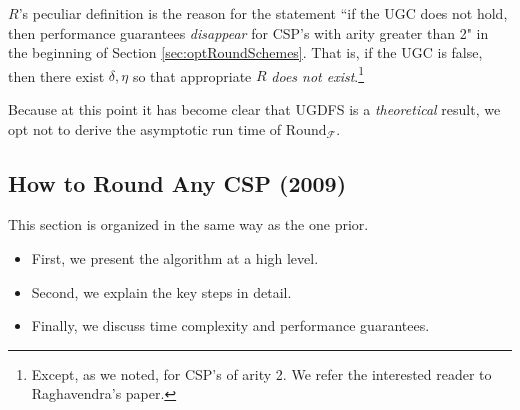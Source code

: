 $R$'s peculiar definition is the reason for the statement ``if the UGC does not hold, then performance guarantees \textit{disappear} for CSP's with arity greater than 2" in the beginning of Section \ref{sec:optRoundSchemes}. That is, if the UGC is false, then there exist $\delta,\eta$ so that appropriate $R$ \textit{does not exist}.\footnote{Except, as we noted, for CSP's of arity 2. We refer the interested reader to Raghavendra's paper.} 

Because at this point it has become clear that UGDFS is a \textit{theoretical} result, we opt not to derive the asymptotic run time of $\text{Round}_{\mathcal{F}}$.

\subsection{How to Round Any CSP (2009)}
This section is organized in the same way as the one prior.
\begin{itemize}
\item First, we present the algorithm at a high level.
\item Second, we explain the key steps in detail.
\item Finally, we discuss time complexity and performance guarantees.
\end{itemize}

